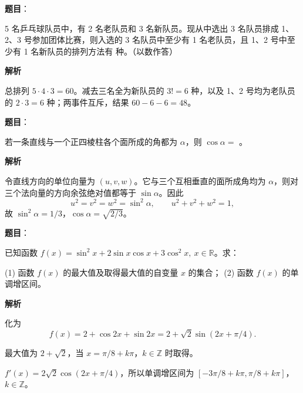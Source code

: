 \begin{answer}

\textbf{题目}：

5 名乒乓球队员中，有 2 名老队员和 3 名新队员。现从中选出 3 名队员排成 1、2、3 号参加团体比赛，则入选的 3 名队员中至少有 1 名老队员，且 1、2 号中至少有 1 名新队员的排列方法有 \gkblank{} 种。（以数作答）

\textbf{解析}

总排列 $5\cdot4\cdot3=60$。减去三名全为新队员的 $3!=6$ 种，以及 1、2 号均为老队员的 $2\cdot3=6$ 种；两事件互斥，结果 $60-6-6=48$。


\end{answer}
\begin{answer}

\textbf{题目}：

若一条直线与一个正四棱柱各个面所成的角都为 $\alpha$，则 $\cos\alpha=$ \gkblank{}。

\textbf{解析}

令直线方向的单位向量为 $(u,v,w)$。它与三个互相垂直的面所成角均为 $\alpha$，则对三个法向量的方向余弦绝对值都等于 $\sin\alpha$。因此
\nopagebreak[4]
\[
u^2=v^2=w^2=\sin^2\alpha,\qquad u^2+v^2+w^2=1,
\]
故 $\sin^2\alpha=1/3$，$\cos\alpha=\sqrt{2/3}$。


\end{answer}
\begin{answer}

\textbf{题目}：

已知函数 $f(x)=\sin^2x+2\sin x\cos x+3\cos^2x,\ x\in\mathbb R$。求：

(1) 函数 $f(x)$ 的最大值及取得最大值的自变量 $x$ 的集合；
(2) 函数 $f(x)$ 的单调增区间。

\textbf{解析}

化为
\nopagebreak[4]
\[
f(x)=2+\cos2x+\sin2x=2+\sqrt2\sin(2x+\pi/4).
\]

最大值为 $2+\sqrt2$，当 $x=\pi/8+k\pi$，$k\in\mathbb Z$ 时取得。

$f'(x)=2\sqrt2\cos(2x+\pi/4)$，所以单调增区间为 $[-3\pi/8+k\pi,\pi/8+k\pi]$，$k\in\mathbb Z$。



\end{answer}
